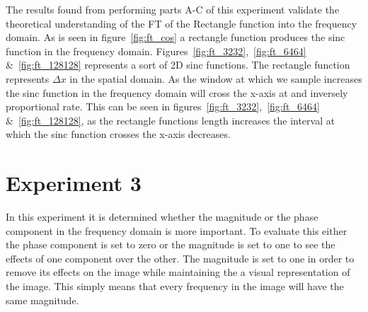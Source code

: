 \documentclass[letter]{article}
\begin{document}
The results found from performing parts A-C of this experiment validate the theoretical understanding of the FT of the Rectangle function into the frequency domain. As is seen in figure~\ref{fig:ft_cos} a rectangle function produces the sinc function in the frequency domain. Figures~\ref{fig:ft_3232},~\ref{fig:ft_6464} \&~\ref{fig:ft_128128} represents a sort of 2D sinc functions. The rectangle function represents $\Delta x$ in the spatial domain. As the window at which we sample increases the sinc function in the frequency domain will cross the x-axis at and inversely proportional rate. This can be seen in figures~\ref{fig:ft_3232},~\ref{fig:ft_6464} \&~\ref{fig:ft_128128}, as the rectangle functions length increases the interval at which the sinc function crosses the x-axis decreases.

\section{Experiment 3}
In this experiment it is determined whether the magnitude or the phase component in the frequency domain is more important. To evaluate this either the phase component is set to zero or the magnitude is set to one to see the effects of one component over the other. The magnitude is set to one in order to remove its effects on the image while maintaining the a visual representation of the image. This simply means that every frequency in the image will have the same magnitude.
\end{document}
